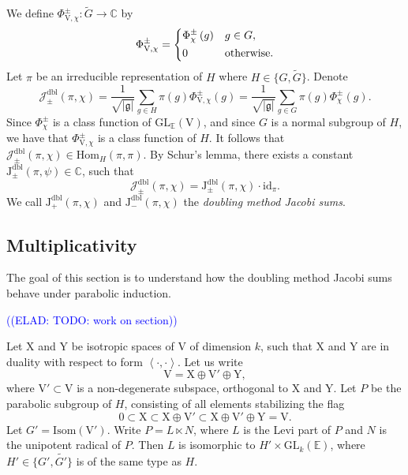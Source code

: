 \documentclass[12pt, reqno]{amsart}
\theoremstyle{definition}
\theoremstyle{definition}
\theoremstyle{definition}
\newcommand{\cComplex}{\mathbb{C}}
\newcommand{\Hom}{\mathrm{Hom}}
\newcommand{\idmap}{\mathrm{id}}
\newcommand{\sizeof}[1]{\left|#1\right|}
\newcommand{\hermitianSpace}{\mathrm{V}}
\newcommand{\xIsotropic}{\mathrm{X}}
\newcommand{\yIsotropic}{\mathrm{Y}}
\newcommand{\innerproduct}[2]{\left\langle #1,#2\right\rangle}
\newcommand{\fieldCharacter}{\psi}
\newcommand{\GL}{\mathrm{GL}}
\newcommand{\GroupExtension}[1]{\widetilde{#1}}
\newcommand{\quadraticExtension}{\mathbb{E}}
\newcommand{\dblJacobiSum}[2]{\mathcal{J}_{\pm}^{\mathrm{dbl}}\left(#1, #2\right)}
\newcommand{\genJacobiKernel}[1]{\Phi^{\pm}_{#1}}
\newcommand{\genHermitianJacobiKernel}[2]{\Phi^{\pm}_{#1,#2}}
\newcommand{\dblJacobiSumScalar}[2]{\mathrm{J}_{\pm}^{\mathrm{dbl}}\left(#1, #2\right)}
\newcommand{\posDblJacobiSumScalar}[2]{\mathrm{J}_{+}^{\mathrm{dbl}}\left(#1, #2\right)}
\newcommand{\negDblJacobiSumScalar}[2]{\mathrm{J}_{-}^{\mathrm{dbl}}\left(#1, #2\right)}
\newcommand{\IsometryGroup}{\mathrm{Isom}}
\newcommand{\lieAlgebra}{\mathfrak{g}}
\newcommand{\elad}[1]{\textcolor{blue}{\sffamily ((ELAD: #1))}}
\begin{document}
We define $\genHermitianJacobiKernel{\hermitianSpace}{\chi} \colon \tilde{G} \to \cComplex$ by $$\genHermitianJacobiKernel{\hermitianSpace}{\chi} =
	\begin{dcases}
		\genJacobiKernel{\chi}\left(g\right) & g \in G,\\
		0 & \text{otherwise.}
	\end{dcases}$$
Let $\pi$ be an irreducible representation of $H$ where $H \in \{G, \GroupExtension{G}\}$. Denote $$\dblJacobiSum{\pi}{\chi} = \frac{1}{\sqrt{\sizeof{\lieAlgebra}}} \sum_{g \in H} \pi\left(g\right) \genHermitianJacobiKernel{\hermitianSpace}{\chi}\left(g\right) = \frac{1}{\sqrt{\sizeof{\lieAlgebra}}} \sum_{g \in G} \pi\left(g\right) \genJacobiKernel{\chi}\left(g\right).$$
Since $\genJacobiKernel{\chi}$ is a class function of $\GL_{\quadraticExtension}\left(\hermitianSpace\right)$, and since $G$ is a normal subgroup of $H$, we have that $\genHermitianJacobiKernel{\hermitianSpace}{\chi}$ is a class function of $H$. It follows that $\dblJacobiSum{\pi}{\chi} \in \Hom_{H}\left(\pi, \pi\right)$. By Schur's lemma, there exists a constant $\dblJacobiSumScalar{\pi}{\fieldCharacter} \in \cComplex$, such that $$\dblJacobiSum{\pi}{\chi} = \dblJacobiSumScalar{\pi}{\chi} \cdot \idmap_\pi.$$
We call $\posDblJacobiSumScalar{\pi}{\chi}$ and $\negDblJacobiSumScalar{\pi}{\chi}$ the \emph{doubling method Jacobi sums}.

\subsection{Multiplicativity}
The goal of this section is to understand how the doubling method Jacobi sums behave under parabolic induction.

\elad{TODO: work on section}

Let $\xIsotropic$ and $\yIsotropic$ be isotropic spaces of $\hermitianSpace$ of dimension $k$, such that $\xIsotropic$ and $\yIsotropic$ are in duality with respect to form $\innerproduct{\cdot}{\cdot}$. Let us write $$\hermitianSpace = \xIsotropic \oplus \hermitianSpace' \oplus \yIsotropic,$$
where $\hermitianSpace' \subset \hermitianSpace$ is a non-degenerate subspace, orthogonal to $\xIsotropic$ and $\yIsotropic$. Let $P$ be the parabolic subgroup of $H$, consisting of all elements stabilizing the flag $$0 \subset \xIsotropic \subset \xIsotropic \oplus \hermitianSpace' \subset \xIsotropic \oplus \hermitianSpace' \oplus \yIsotropic = \hermitianSpace.$$
Let $G' = \IsometryGroup\left(\hermitianSpace'\right)$. Write $P = L \ltimes N$, where $L$ is the Levi part of $P$ and $N$ is the unipotent radical of $P$. Then $L$ is isomorphic to $H' \times \GL_k\left(\quadraticExtension\right)$, where $H' \in \{G',\GroupExtension{G'}\}$ is of the same type as $H$. 
\end{document}
